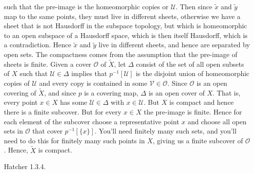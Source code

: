 \begin{solution}
        such that the pre-image is the homeomorphic copies or $\mathcal{U}$.
        Then since $\tilde{x}$ and $\tilde{y}$ map to the same points, they must
        live in different sheets, otherwise we have a sheet that is not
        Hausdorff in the subspace topology, but which is homeomorphic to an open
        subspace of a Hausdorff space, which is then itself Hausdorff, which is
        a contradiction. Hence $\tilde{x}$ and $\tilde{y}$ live in different
        sheets, and hence are separated by open sets. The compactness comes from
        the assumption that the pre-image of sheets is finite. Given a cover
        $\mathcal{O}$ of $\tilde{X}$, let $\Delta$ consist of the set of all
        open subsets of $X$ such that $\mathcal{U}\in\Delta$ implies that
        $p^{\minus{1}}[\mathcal{U}]$ is the disjoint union of homeomorphic
        copies of $\mathcal{U}$ and every copy is contained in some
        $\mathcal{V}\in\mathcal{O}$. Since $\mathcal{O}$ is an open covering of
        $\tilde{X}$, and since $p$ is a covering map, $\Delta$ is an open cover
        of $X$. That is, every point $x\in{X}$ has some $\mathcal{U}\in\Delta$
        with $x\in\mathcal{U}$. But $X$ is compact and hence there is a finite
        subcover. But for every $x\in{X}$ the pre-image is finite. Hence for
        each element of the subcover choose a representative point $x$ and
        choose all open sets in $\mathcal{O}$ that cover $p^{\minus{1}}[\{x\}]$.
        You'll need finitely many such sets, and you'll need to do this for
        finitely many such points in $X$, giving us a finite subcover of
        $\mathcal{O}$. Hence, $\tilde{X}$ is compact.
    \end{solution}
    \begin{problem}
        \label{prob:Hatcher_1_3_4}%
        Hatcher 1.3.4.
    \end{problem}
